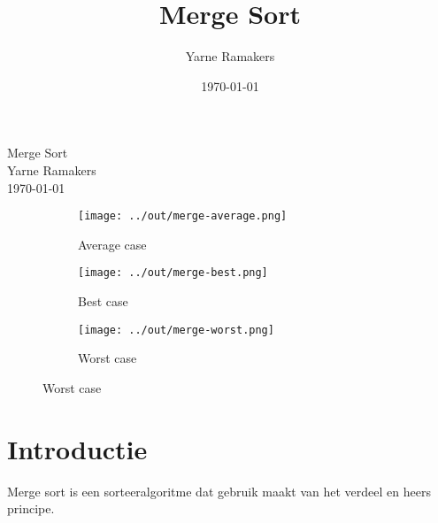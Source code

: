 \documentclass[a4paper]{article}
\title{Merge Sort}
\author{Yarne Ramakers}
\date{\today}
\begin{document}
\begin{center}
  Merge Sort \\
  Yarne Ramakers \\
  \today \\
\end{center}

\begin{figure}[h]
  \begin{subfigure}{0.3\textwidth}
    \texttt{[image: ../out/merge-average.png]}
    \caption{Average case}
    \label{fig:merge-avg}
  \end{subfigure}
  \begin{subfigure}[b]{0.3\textwidth}
    \texttt{[image: ../out/merge-best.png]}
    \caption{Best case}
    \label{fig:merge-best}
  \end{subfigure}
  \begin{subfigure}[b]{0.3\textwidth}
    \texttt{[image: ../out/merge-worst.png]}
    \caption{Worst case}
    \label{fig:merge-worst}
  \end{subfigure}
\end{figure}

\section{Introductie}
Merge sort is een sorteeralgoritme dat gebruik maakt van het verdeel en heers principe.
\end{document}
